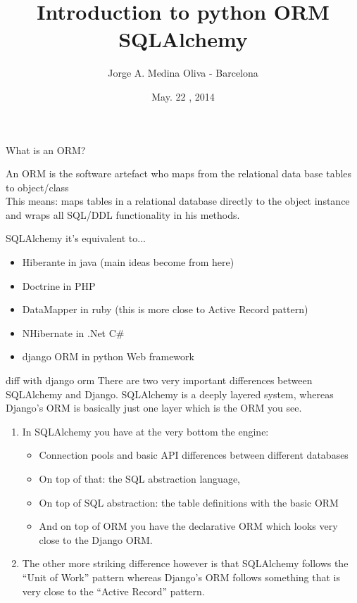 \documentclass[seagull]{beamer}
\title{Introduction to python ORM SQLAlchemy}
\author{
	Jorge A. Medina Oliva - Barcelona
}
\institute{http://pybcn.org}
\date{May. 22 , 2014}
\begin{document}
\begin{frame}
\titlepage
\end{frame}


\begin{frame}{What is an ORM?}

An ORM is the software artefact who maps from the relational data base tables to object/class\\
This means: maps tables in a relational database directly to the object instance and wraps all SQL/DDL functionality in his methods.
\end{frame}

\begin{frame}{SQLAlchemy it's equivalent to...}
\begin{itemize}
	\item Hiberante in java (main ideas become from here)
	\item Doctrine in PHP
	\item DataMapper in ruby (this is more close to Active Record pattern)
	\item NHibernate in .Net C\#
	\item django ORM in python Web framework
\end{itemize}
\end{frame}

\begin{frame}{diff with django orm}
	There are two very important differences between SQLAlchemy and Django. SQLAlchemy is a deeply layered 	system, whereas Django's ORM is basically just one layer which is the ORM you see. 
	\begin{enumerate}
	\item In SQLAlchemy you have at the very bottom the engine:
		\begin{itemize}
			\item Connection pools and basic API differences between different databases
			\item On top of that: the SQL abstraction language,
			\item On top of SQL abstraction: the table definitions with the basic ORM 
			\item And on top of ORM you have the declarative ORM which looks very close to the Django ORM. 
		\end{itemize}
	\item The other more striking difference however is that SQLAlchemy follows the “Unit of Work” pattern whereas Django's ORM follows something that is very close to the “Active Record” pattern.
	\end{enumerate}
\end{frame}
\end{document}

